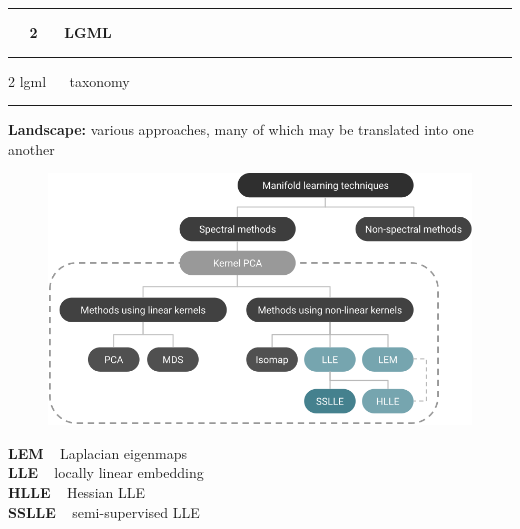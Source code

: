 \documentclass[11pt, compress, t, notes = noshow, xcolor = table, 
aspectratio = 1610]{beamer}
\newcommand{\highlight}[1]{\textcolor{highlightcol}{\textbf{#1}}}
\begin{document}

\LARGE
\begin{frame}[noframenumbering]{\phantom{foo}}
\normalsize
\vspace{-0.5cm}
\noindent \textcolor{gray!90}{\rule{\textwidth}{1pt}}
\smallskip

\Huge
\hspace{0pt}
\vfill
\textbf{\highlight{~~ 2 ~~ LGML}}
\vfill
\hspace{0pt}

\noindent \textcolor{gray!90}{\rule{\textwidth}{1pt}}

\end{frame}


\LARGE
\begin{frame}{\textcolor{gray!90}{2 lgml} ~~ taxonomy}
\normalsize
\vspace{-0.5cm}
\noindent \textcolor{gray!90}{\rule{\textwidth}{1pt}}
\smallskip

\textbf{Landscape:} various approaches, many of which may be translated into one
another

\vspace{0.5cm}

\begin{minipage}[b]{0.65\textwidth}
  \begin{figure}[H]
    \includegraphics[trim = 0 0 0 0, clip, %
      width = \textwidth]{figures/models_overview}
  \end{figure}
\end{minipage}%
\begin{minipage}[b]{0.35\textwidth}
  \highlight{LEM} ~ Laplacian eigenmaps \\
  \highlight{LLE} ~ locally linear embedding \\
  \highlight{HLLE} ~ Hessian LLE \\
  \highlight{SSLLE} ~ semi-supervised LLE 
\end{minipage}

\end{frame}
\end{document}
